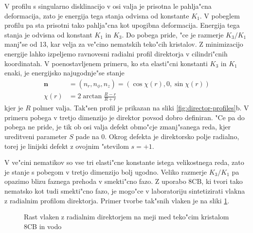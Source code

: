 \documentclass[a4paper,10pt]{article}
\renewcommand{\vec}{\mathbf}
\begin{document}
V profilu s singularno disklinacijo v osi valja je prisotna le pahlja"cna deformacija, zato je energija tega stanja odvisna od konstante $K_1$. 
V pobeglem profilu pa sta prisotni tako pahlja"cna kot upogibna deformacija. Energija tega stanja je odvisna od konstant $K_1$ in $K_3$. Do pobega pride, "ce je razmerje $K_3/K_1$ manj"se od 13, kar velja za ve"cino nematskih teko"cih kristalov. Z minimizacijo energije lahko izpeljemo ravnovesni radialni profil direktorja v cilindri"cnih koordinatah. V poenostavljenem primeru, ko sta elasti"cni konstanti $K_3$ in $K_1$ enaki, je energijsko najugodnje"se stanje\cite{kleman} 
\begin{align}
 \vec n &= (n_r, n_\phi, n_z) = (\cos \chi(r), 0, \sin \chi(r)) \\
 \chi(r) &= 2 \arctan \frac{R-r}{R+r}
\end{align}
kjer je $R$ polmer valja. Tak"sen profil je prikazan na sliki \ref{fig:director-profiles}b. V primeru pobega v tretjo dimenzijo je direktor povsod dobro definiran. "Ce pa do pobega ne pride, je tik ob osi valja defekt obmo"cje zmanj"sanega reda, kjer ureditveni parameter $S$ pade na 0. Okrog defekta je direktorsko polje radialno, torej je linijski defekt z ovojnim "stevilom $s=+1$. 

V ve"cini nematikov so vse tri elasti"cne konstante istega velikostnega reda, zato je stanje s pobegom v tretjo dimenzijo bolj ugodno. 
Veliko razmerje $K_3/K_1$ pa opazimo blizu faznega prehoda v smekti"cno fazo. 
Z uporabo 8CB, ki tvori tako nematsko kot tudi smekti"cno fazo, je mogo"ce v laboratoriju sintetizirati vlakna z radialnim profilom direktorja\cite{peddireddy}. 
Primer tvorbe tak"snih vlaken je na sliki \ref{fig:tvorjenje}. 

\begin{figure}[h]
 \centering
 \caption{Rast vlaken z radialnim direktorjem na meji med teko"cim kristalom 8CB in vodo\cite{peddireddy}}
 \label{fig:tvorjenje}
\end{figure}
\end{document}
